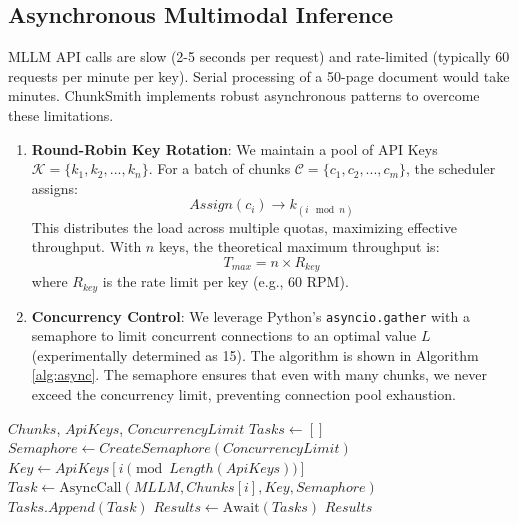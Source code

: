 \documentclass[conference]{IEEEtran}
\begin{document}
\subsection{Asynchronous Multimodal Inference}
MLLM API calls are slow (2-5 seconds per request) and rate-limited (typically 60 requests per minute per key). Serial processing of a 50-page document would take minutes. ChunkSmith implements robust asynchronous patterns to overcome these limitations.
\begin{enumerate}
    \item \textbf{Round-Robin Key Rotation}: We maintain a pool of API Keys $\mathcal{K} = \{k_1, k_2, ..., k_n\}$. For a batch of chunks $\mathcal{C} = \{c_1, c_2, ..., c_m\}$, the scheduler assigns:
    \begin{equation}
    Assign(c_i) \rightarrow k_{(i \mod n)}
    \end{equation}
    This distributes the load across multiple quotas, maximizing effective throughput. With $n$ keys, the theoretical maximum throughput is:
    \begin{equation}
    T_{max} = n \times R_{key}
    \end{equation}
    where $R_{key}$ is the rate limit per key (e.g., 60 RPM).
    \item \textbf{Concurrency Control}: We leverage Python’s \texttt{asyncio.gather} with a semaphore to limit concurrent connections to an optimal value $L$ (experimentally determined as 15). The algorithm is shown in Algorithm \ref{alg:async}. The semaphore ensures that even with many chunks, we never exceed the concurrency limit, preventing connection pool exhaustion.
\end{enumerate}

\begin{algorithm}
\caption{Async Chunk Processing with Key Rotation}
\label{alg:async}
\begin{algorithmic}[1]
\REQUIRE $Chunks$, $ApiKeys$, $ConcurrencyLimit$
\STATE $Tasks \leftarrow []$
\STATE $Semaphore \leftarrow CreateSemaphore(ConcurrencyLimit)$
    \STATE $Key \leftarrow ApiKeys[i \pmod{Length(ApiKeys)}]$
    \STATE $Task \leftarrow \text{AsyncCall}(MLLM, Chunks[i], Key, Semaphore)$
    \STATE $Tasks.Append(Task)$
\ENDFOR
\STATE $Results \leftarrow \text{Await}(Tasks)$
\RETURN $Results$
\end{algorithmic}
\end{algorithm}
\end{document}
